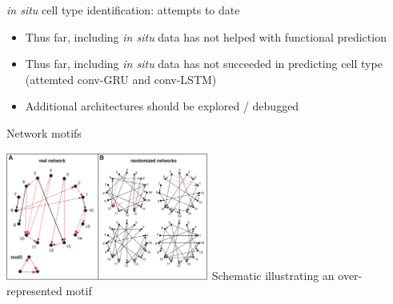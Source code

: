\begin{frame}{ \emph{in situ} cell type identification: attempts to date}
    \begin{itemize}
        \item Thus far, including \emph{in situ} data has not helped with functional prediction
        \item Thus far, including \emph{in situ} data has not succeeded in predicting cell type (attemted conv-GRU and conv-LSTM)
        \item Additional architectures should be explored / debugged
    \end{itemize}
\end{frame}{}

\begin{frame}{ Network motifs }
    \begin{multicols}{2}
        \includegraphics[width=0.5\textwidth]{media/motif_schematic.png}
        Schematic illustrating an over-represented motif


\end{multicols}
\end{frame}
